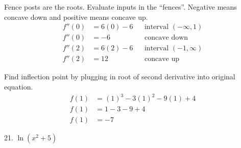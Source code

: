 \documentclass{article}
\begin{document}
\begin{description}
\begin{description}
                Fence posts are the roots. Evaluate inputs in the ``fences''. Negative means concave
                down and positive means concave up.
                \begin{align*}
                  f''(0) & = 6(0) - 6  &  & \text{interval $(-\infty, 1)$} \\
                  f''(0) & = -6        &  & \text{concave down}            \\[2em]
                  f''(2) & =  6(2) - 6 &  & \text{interval $(-1, \infty)$} \\
                  f''(2) & = 12        &  & \text{concave up}
                \end{align*}

                Find inflection point by plugging in root of second derivative into original equation.
                \begin{align*}
                  f(1) & = (1)^3-3(1)^2 - 9(1) + 4 \\
                  f(1) & = 1 - 3 - 9 + 4           \\
                  f(1) & = -7
                \end{align*}
          \item 21. $\ln{(x^2+5)}$


\end{description}
\end{description}
\end{document}
